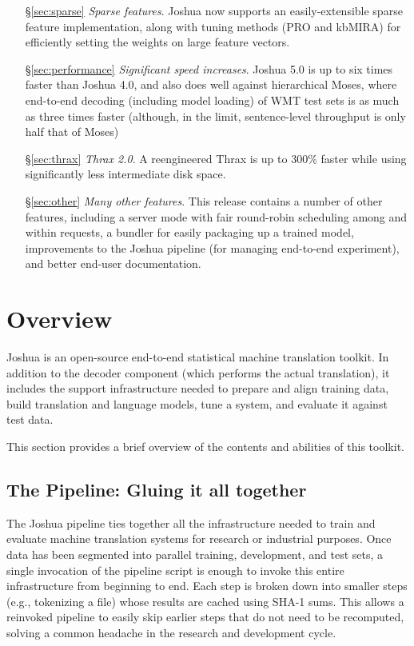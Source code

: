 \documentclass[11pt]{article}
\begin{document}
\begin{itemize}
  \item[\S\ref{sec:sparse}] \emph{Sparse features}. Joshua now supports an
    easily-extensible sparse feature implementation, along with tuning
    methods (PRO and kbMIRA) for efficiently setting the weights on
    large feature vectors.
  \item[\S\ref{sec:performance}] \emph{Significant speed
    increases}. Joshua 5.0 is up to six times faster than Joshua 4.0,
    and also does well against hierarchical Moses, where end-to-end
    decoding (including model loading) of WMT test sets is as much as
    three times faster (although, in the limit, sentence-level
    throughput is only half that of Moses)
  \item[\S\ref{sec:thrax}] \emph{Thrax 2.0}. A reengineered Thrax is
    up to 300\% faster while using significantly less intermediate
    disk space.
  \item[\S\ref{sec:other}] \emph{Many other features}. This release
    contains a number of other features, including a server mode with
    fair round-robin scheduling among and within requests, a bundler
    for easily packaging up a trained model, improvements to the
    Joshua pipeline (for managing end-to-end experiment), and better
    end-user documentation.
\end{itemize}

\section{Overview}

Joshua is an open-source end-to-end statistical machine translation
toolkit. In addition to the decoder component (which performs the
actual translation), it includes the support infrastructure needed to
prepare and align training data, build translation and language
models, tune a system, and evaluate it against test data. 

This section provides a brief overview of the contents and abilities
of this toolkit.

\subsection{The Pipeline: Gluing it all together}

The Joshua pipeline ties together all the infrastructure needed to
train and evaluate machine translation systems for research or
industrial purposes. Once data has been segmented into parallel
training, development, and test sets, a single invocation of the
pipeline script is enough to invoke this entire infrastructure from
beginning to end. Each step is broken down into smaller steps (e.g.,
tokenizing a file) whose results are cached using SHA-1 sums. This
allows a reinvoked pipeline to easily skip earlier steps that do not
need to be recomputed, solving a common headache in the research and
development cycle.
\end{document}
